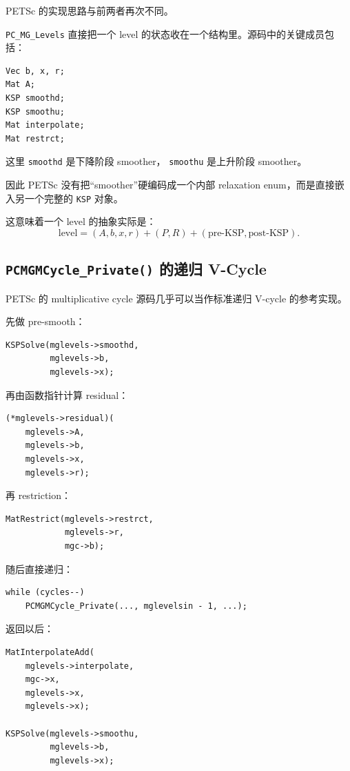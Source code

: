 PETSc 的实现思路与前两者再次不同。

\texttt{PC\_MG\_Levels} 直接把一个 level 的状态收在一个结构里。源码中的关键成员包括：

\begin{verbatim}
Vec b, x, r;
Mat A;
KSP smoothd;
KSP smoothu;
Mat interpolate;
Mat restrct;
\end{verbatim}

这里
\texttt{smoothd} 是下降阶段 smoother，
\texttt{smoothu} 是上升阶段 smoother。

因此 PETSc 没有把“smoother”硬编码成一个内部 relaxation enum，而是直接嵌入另一个完整的 \texttt{KSP} 对象。

这意味着一个 level 的抽象实际是：
\begin{equation}
\boxed{
\text{level}
=
(A,b,x,r)
+
(P,R)
+
(\text{pre-KSP},\text{post-KSP}).
}
\label{eq:software-petsc-level-object}
\end{equation}

\subsection{\texttt{PCMGMCycle\_Private()} 的递归 V-Cycle}

PETSc 的 multiplicative cycle 源码几乎可以当作标准递归 V-cycle 的参考实现。

先做 pre-smooth：
\begin{verbatim}
KSPSolve(mglevels->smoothd,
         mglevels->b,
         mglevels->x);
\end{verbatim}

再由函数指针计算 residual：
\begin{verbatim}
(*mglevels->residual)(
    mglevels->A,
    mglevels->b,
    mglevels->x,
    mglevels->r);
\end{verbatim}

再 restriction：
\begin{verbatim}
MatRestrict(mglevels->restrct,
            mglevels->r,
            mgc->b);
\end{verbatim}

随后直接递归：

\begin{verbatim}
while (cycles--)
    PCMGMCycle_Private(..., mglevelsin - 1, ...);
\end{verbatim}

返回以后：

\begin{verbatim}
MatInterpolateAdd(
    mglevels->interpolate,
    mgc->x,
    mglevels->x,
    mglevels->x);

KSPSolve(mglevels->smoothu,
         mglevels->b,
         mglevels->x);
\end{verbatim}

